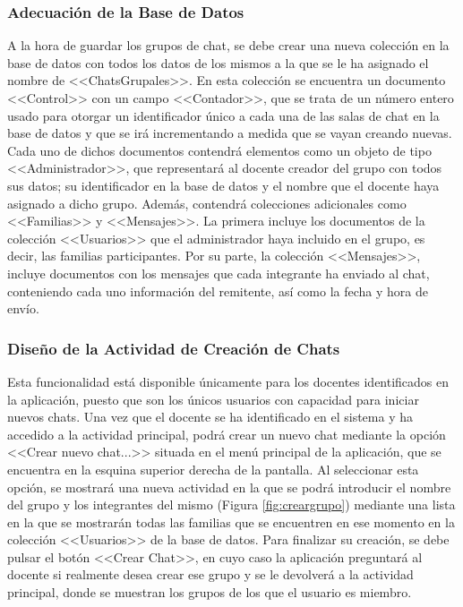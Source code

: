 \subsubsection{Adecuación de la Base de Datos}
A la hora de guardar los grupos de chat, se debe crear una nueva colección en la base de datos con todos los datos de los mismos a la que se le ha asignado el nombre de \mbox{<<ChatsGrupales>>}. En esta colección se encuentra un documento <<Control>> con un campo <<Contador>>, que se trata de un número entero usado para otorgar un identificador único a cada una de las salas de chat en la base de datos y que se irá incrementando a medida que se vayan creando nuevas. Cada uno de dichos documentos contendrá elementos como un objeto de tipo <<Administrador>>, que representará al docente creador del grupo con todos sus datos; su identificador en la base de datos y el nombre que el docente haya asignado a dicho grupo. Además, contendrá colecciones adicionales como <<Familias>> y <<Mensajes>>. La primera incluye los documentos de la colección <<Usuarios>> que el administrador haya incluido en el grupo, es decir, las familias participantes. Por su parte, la colección <<Mensajes>>, incluye documentos con los mensajes que cada integrante ha enviado al chat, conteniendo cada uno información del remitente, así como la fecha y hora de envío.

\subsubsection{Diseño de la Actividad de Creación de Chats}
Esta funcionalidad está disponible únicamente para los docentes identificados en la aplicación, puesto que son los únicos usuarios con capacidad para iniciar nuevos chats. Una vez que el docente se ha identificado en el sistema y ha accedido a la actividad principal, podrá crear un nuevo chat mediante la opción <<Crear nuevo chat...>> situada en el menú principal de la aplicación, que se encuentra en la esquina superior derecha de la pantalla. Al seleccionar esta opción, se mostrará una nueva actividad en la que se podrá introducir el nombre del grupo y los integrantes del mismo (Figura \ref{fig:creargrupo}) mediante una lista en la que se mostrarán todas las familias que se encuentren en ese momento en la colección <<Usuarios>> de la base de datos. Para finalizar su creación, se debe pulsar el botón <<Crear Chat>>, en cuyo caso la aplicación preguntará al docente si realmente desea crear ese grupo y se le devolverá a la actividad principal, donde se muestran los grupos de los que el usuario es miembro.

